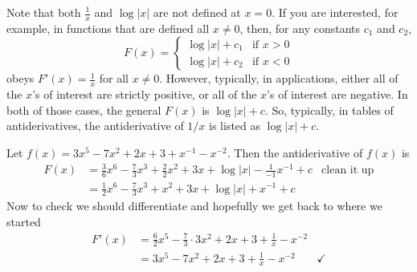 Note that both $\frac{1}{x}$ and $\log|x|$ are not defined at $x=0$. 
If you are interested, for example, in functions that are defined all $x\ne 0$, then, for any
constants $c_1$ and $c_2$,
\begin{equation*}
F(x) = \begin{cases}
             \log|x| + c_1 & \text{if }x>0 \\
             \log|x| + c_2 & \text{if }x<0
       \end{cases}
\end{equation*}
obeys $F'(x) = \frac{1}{x}$ for all $x\ne 0$. However, typically, 
in applications, either all of the $x$'s of interest are strictly positive, or all of the $x$'s of 
interest are negative. In both of those cases, the general $F(x)$ is $\log|x| + c$.
So, typically, in tables of antiderivatives, the antiderivative of $1/x$ is listed as $\log|x| + c$. 

\begin{eg}\label{eg antidiff poly}
 Let $f(x) = 3x^5-7x^2+2x+3 + x^{-1} - x^{-2}$. Then the antiderivative of $f(x)$ is
\begin{align*}
  F(x) &= \frac{3}{6}x^6 - \frac{7}{3}x^3 + \frac{2}{2}x^2 + 3x +\log|x| - \frac{1}{-1}
x^{-1} + c & \text{clean it up}\\
  &= \frac{1}{2}x^6 - \frac{7}{3}x^3 +  x^2 + 3x +\log|x| + x^{-1} + c
\end{align*}
Now to check we should differentiate and hopefully we get back to where we started
\begin{align*}
  F'(x) &= \frac{6}{2}x^5 - \frac{7}{3} \cdot 3 x^2 +  2 x + 3 + \frac{1}{x} - x^{-2}\\
  &= 3 x^5 - 7 x^2 +  2 x + 3 + \frac{1}{x} - x^{-2} & \checkmark
\end{align*}
\end{eg}

